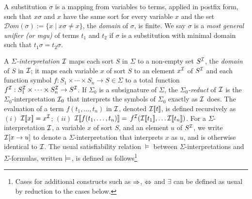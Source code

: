 \documentclass{svjour3}                     %
\begin{document}
A substitution $\sigma$ is a mapping from variables to terms, applied in postfix form, 
such that $x\sigma$ and $x$ have the same sort for every variable $x$
and the set $\mathcal{D}om(\sigma) := \{ x \mid x \sigma \neq x \}$,
the \emph{domain} of $\sigma$, is finite.
We say $\sigma$ is a \emph{most general unifier (or mgu)} of terms $t_1$ and $t_2$ 
if $\sigma$ is a substitution with minimal domain
such that $t_1 \sigma = t_2 \sigma$.

A \emph{$\Sigma$-interpretation $\mathcal{I}$} maps
each sort $S$ in $\Sigma$ to a non-empty set $S^{\mathcal{I}}$,
the \emph{domain} of $S$ in $\mathcal{I}$;
it maps each variable $x$ of sort $S$ to an element $x^{\mathcal{I}}$ of $S^{\mathcal{I}}$
and each function symbol 
$f : S_1 \times \cdots \times S_n \rightarrow S \in \Sigma$ 
to a total function 
$f^{\mathcal{I}} : S_1^{\mathcal{I}} \times \cdots \times S_n^{\mathcal{I}} \rightarrow S^{\mathcal{I}}$.
If $\Sigma_0$ is a subsignature of $\Sigma$,
the \emph{$\Sigma_0$-reduct} of $\mathcal{I}$ is the $\Sigma_0$-interpretation $\mathcal{I}_0$ 
that interprets the symbols of $\Sigma_0$ exactly as $\mathcal{I}$ does.
%
The evaluation of a term $f( t_1, \ldots, t_n )$ in $\mathcal{I}$, denoted
$\mathcal{I} [ \negthinspace [ t ] \negthinspace ]$, is defined recursively as
$(i)$ $\mathcal{I} [ \negthinspace [ x ] \negthinspace ] = x^{\mathcal{I}}$;
$(ii)$ $\mathcal{I} [ \negthinspace [ f( t_1, \ldots, t_n ) ] \negthinspace ] =$ $f^{\mathcal{I}}( \mathcal{I} [ \negthinspace [ t_1 ] \negthinspace ], \ldots \mathcal{I} [ \negthinspace [ t_n ] \negthinspace ] )$.
For a $\Sigma$-interpretation $\mathcal{I}$, a variable $x$ of sort $S$, and an element $u$ 
of  $S^{\mathcal{I}}$,
we write $\mathcal{I}[x \rightarrow u]$ to denote a $\Sigma$-interpretation that interprets
$x$ as $u$,
and is otherwise identical to $\mathcal{I}$.
The usual satisfiability relation $\models$ between $\Sigma$-interpretations and 
$\Sigma$-formulas, written $\models_{}$, is defined as follows\footnote{%
Cases for additional constructs such as $\Rightarrow$, $\Leftrightarrow$ and $\exists$ can be defined as usual
by reduction to the cases below.
}
\end{document}
